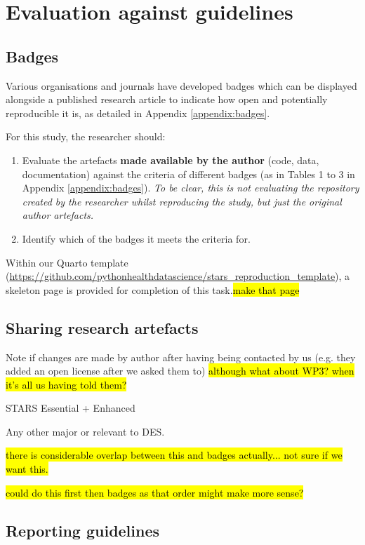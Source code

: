 \section{Evaluation against guidelines}

\subsection{Badges} \label{sec:badges}
\timeno

Various organisations and journals have developed badges which can be displayed alongside a published research article to indicate how open and potentially reproducible it is, as detailed in Appendix \ref{appendix:badges}.

For this study, the researcher should:
\begin{enumerate}
    \item Evaluate the artefacts \textbf{made available by the author} (code, data, documentation) against the criteria of different badges (as in Tables 1 to 3 in Appendix \ref{appendix:badges}). \textit{To be clear, this is not evaluating the repository created by the researcher whilst reproducing the study, but just the original author artefacts.}
    \item Identify which of the badges it meets the criteria for.
\end{enumerate}

Within our Quarto template (\url{https://github.com/pythonhealthdatascience/stars_reproduction_template}), a skeleton page is provided for completion of this task.\hl{make that page}

\subsection{Sharing research artefacts} \label{sec:artefacts}
\timeno

Note if changes are made by author after having being contacted by us (e.g. they added an open license after we asked them to) \hl{although what about WP3? when it's all us having told them?}

STARS Essential + Enhanced

Any other major or relevant to DES.

\hl{there is considerable overlap between this and badges actually... not sure if we want this.}

\hl{could do this first then badges as that order might make more sense?}

\subsection{Reporting guidelines} \label{sec:reporting}
\timeno

